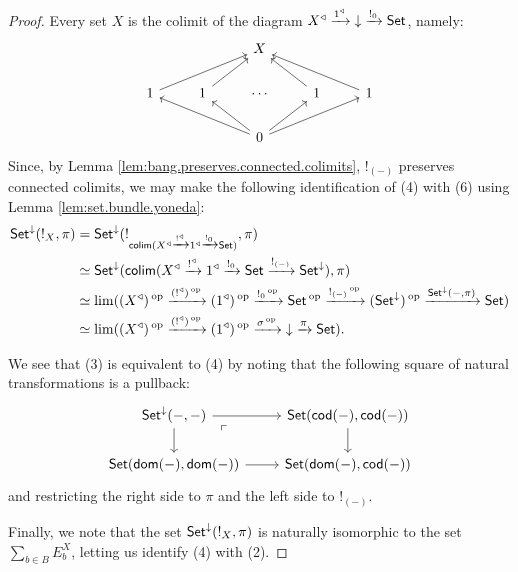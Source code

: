 \begin{proof}
Every set $X$ is the colimit of the diagram $X^{\triangleleft}
\xrightarrow{1^{\triangleleft}}\mathbin{\downarrow} \xrightarrow{!_0} \operatorname{\mathsf{{Set}}}$, namely:
\[
\begin{tikzcd}
              &              & X                                               &              &               \\
1 \arrow[rru] & 1 \arrow[ru] & \cdots                                          & 1 \arrow[lu] & 1 \arrow[llu] \\
              &              & 0 \arrow[llu] \arrow[lu] \arrow[ru] \arrow[rru] &              &              
\end{tikzcd}
\]
Since, by Lemma \ref{lem:bang.preserves.connected.colimits}, $!_{(-)}$
preserves connected colimits, we may make the following identification of (4)
with (6) using Lemma \ref{lem:set.bundle.yoneda}: 
\begin{align*}
  \operatorname{\mathsf{{Set}}}^{\mathbin{\downarrow}}(!_X, \pi) &= \operatorname{\mathsf{{Set}}}^{\mathbin{\downarrow}}(!_{\operatorname{\mathsf{colim}}(X^{\triangleleft} \xrightarrow{!^{\triangleleft}} 1^{\triangleleft} \xrightarrow{!_0} \operatorname{\mathsf{{Set}}})}, \pi) \\
  &\simeq \operatorname{\mathsf{{Set}}}^{\mathbin{\downarrow}}(\operatorname{\mathsf{colim}}(X^{\triangleleft} \xrightarrow{!^{\triangleleft}} 1^{\triangleleft} \xrightarrow{!_0} \operatorname{\mathsf{{Set}}} \xrightarrow{!_{(-)}} \operatorname{\mathsf{{Set}}}^{\mathbin{\downarrow}}), \pi)\\
&\simeq \lim((X^{\triangleleft})\operatorname{^\textnormal{op}} \xrightarrow{(!^{\triangleleft})\operatorname{^\textnormal{op}}} (1^{\triangleleft})\operatorname{^\textnormal{op}} \xrightarrow{!_0\operatorname{^\textnormal{op}}} \operatorname{\mathsf{{Set}}}\operatorname{^\textnormal{op}} \xrightarrow{!_{(-)}\operatorname{^\textnormal{op}}} (\operatorname{\mathsf{{Set}}}^{\mathbin{\downarrow}})\operatorname{^\textnormal{op}} \xrightarrow{\operatorname{\mathsf{{Set}}}^{\mathbin{\downarrow}}(-, \pi)} \operatorname{\mathsf{{Set}}}) \\
&\simeq \lim((X^{\triangleleft})\operatorname{^\textnormal{op}} \xrightarrow{(!^{\triangleleft})\operatorname{^\textnormal{op}}} (1^{\triangleleft})\operatorname{^\textnormal{op}} \xrightarrow{\sigma\operatorname{^\textnormal{op}}} \mathbin{\downarrow} \xrightarrow{\pi} \operatorname{\mathsf{{Set}}}).
\end{align*}

We see that (3) is equivalent to (4) by noting that the following square of
natural transformations is a pullback:
\[
\begin{tikzcd}
{\Set^{\downarrow}(-, -)} \arrow[d] \arrow[r] \arrow[rd, phantom, "\ulcorner" very near start] & {\Set(\cod(-), \cod(-))} \arrow[d] \\
{\Set(\dom(-), \dom(-))} \arrow[r]                       & {\Set(\dom(-), \cod(-))}          
\end{tikzcd}
\]
and restricting the right side to $\pi$ and the left side to $!_{(-)}$.

Finally, we note that the set $\operatorname{\mathsf{{Set}}}^{\mathbin{\downarrow}}(!_X, \pi)$ is naturally
isomorphic to the set $\sum_{b \in B} E_b^X$, letting us identify (4) with (2).
\end{proof}

